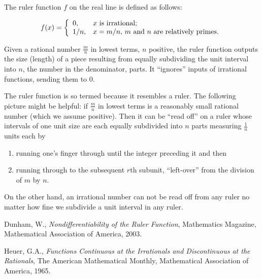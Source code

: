 \documentclass[12pt]{article}
\begin{document}
The ruler function $f$ on the real line is defined as follows:

\begin{equation}
    f(x)=\left\{
           \begin{array}{ll}
             0, & \hbox{$x$ is irrational;} \\
             1/n, & \hbox{$x=m/n$, $m$ and $n$ are relatively primes}.
           \end{array}
         \right.
\end{equation}

Given a rational number $\frac{m}{n}$ in lowest terms, $n$ positive, the ruler function outputs the size (length) of a piece resulting from equally subdividing the unit interval into $n$, the number in the denominator, parts. It ``ignores'' inputs of irrational functions, sending them to 0.

The ruler function is so termed because it resembles a ruler. The following picture might be helpful: if $\frac{m}{n}$ in lowest terms  is a reasonably small rational number (which we assume positive). Then it can be ``read off'' on a ruler whose intervals of one unit size are each equally subdivided into $n$ parts measuring $\frac{1}{n}$ units each by 
\begin{enumerate}
\item{running one's finger through until the integer preceding it and then} 
\item{running through to the subsequent $r$th subunit, ``left-over'' from the division of $m$ by $n$.} 
\end{enumerate}
On the other hand, an irrational number can not be read off from any ruler no matter how fine we subdivide a unit interval in any ruler.

\begin{thebibliography}{1}
Dunham, W., \emph{Nondifferentiability of the Ruler Function}, Mathematics Magazine, Mathematical Association of America, 2003.

Heuer, G.A., \emph{Functions Continuous at the Irrationals and Discontinuous at the Rationals}, The American Mathematical Monthly, Mathematical Association of America, 1965.
\end{thebibliography}
\end{document}

